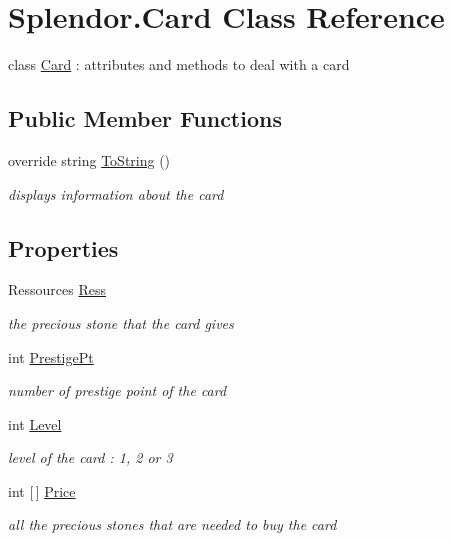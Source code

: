 \hypertarget{class_splendor_1_1_card}{}\section{Splendor.\+Card Class Reference}
\label{class_splendor_1_1_card}


class \hyperlink{class_splendor_1_1_card}{Card} \+: attributes and methods to deal with a card  


\subsection*{Public Member Functions}
\begin{DoxyCompactItemize}
\item 
override string \hyperlink{class_splendor_1_1_card_a3403c28ee02b119ee5aae5bd10eee468}{To\+String} ()
\begin{DoxyCompactList}\small\item\em displays information about the card \end{DoxyCompactList}\end{DoxyCompactItemize}
\subsection*{Properties}
\begin{DoxyCompactItemize}
\item 
Ressources \hyperlink{class_splendor_1_1_card_afcfaa7ea5072b3cd30c04adddc8dd5c7}{Ress}
\begin{DoxyCompactList}\small\item\em the precious stone that the card gives \end{DoxyCompactList}\item 
int \hyperlink{class_splendor_1_1_card_a117119ceac083b7b7d39f11e5bbd7225}{Prestige\+Pt}
\begin{DoxyCompactList}\small\item\em number of prestige point of the card \end{DoxyCompactList}\item 
int \hyperlink{class_splendor_1_1_card_aadc9953aeb322c82e04fbd9b5a3b996d}{Level}
\begin{DoxyCompactList}\small\item\em level of the card \+: 1, 2 or 3 \end{DoxyCompactList}\item 
int \mbox{[}$\,$\mbox{]} \hyperlink{class_splendor_1_1_card_afee1b5ccf0c6745bdd9b7642a0158fae}{Price}
\begin{DoxyCompactList}\small\item\em all the precious stones that are needed to buy the card \end{DoxyCompactList}\end{DoxyCompactItemize}


